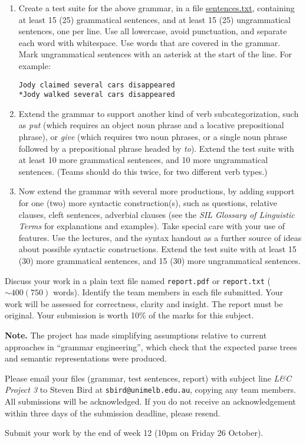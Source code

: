 \documentclass[a4paper,10pt]{article}
\begin{document}
\begin{enumerate}
\item Create a test suite for the above grammar, in a file
\url{sentences.txt}, containing at least 15 (25) grammatical sentences, and at least
15 (25) ungrammatical sentences, one per line.  Use all lowercase, avoid
punctuation, and separate each word with whitespace.   Use words that
are covered in the grammar.
Mark ungrammatical sentences with an asterisk
at the start of the line.  For example:

\begin{verbatim}
Jody claimed several cars disappeared
*Jody walked several cars disappeared
\end{verbatim}

\item Extend the grammar to support another kind of verb subcategorization,
such as \emph{put} (which requires an object noun phrase and a locative
prepositional phrase), or \emph{give} (which requires two noun phrases, or a
single noun phrase followed by a prepositional phrase headed by \emph{to}).
Extend the test suite with at least 10 more grammatical sentences, and 10 more
ungrammatical sentences. (Teams should do this twice, for two different verb types.)

\item Now extend the grammar with several more productions, by adding support
for one (two) more syntactic construction(s), such as
questions, relative clauses, cleft sentences, adverbial clauses
(see the \emph{SIL Glossary of Linguistic Terms} for explanations
and examples).  Take special care with your use of features.
Use the lectures, and the syntax handout
as a further source of ideas about possible syntactic constructions.  Extend the
test suite with at least 15 (30) more grammatical sentences, and 15 (30) more ungrammatical sentences.

\end{enumerate}

Discuss your work in a plain text file named \verb|report.pdf| or \verb|report.txt| ($\sim 400 (750)$ words).
Identify the team members in each file submitted.
Your work will be assessed for correctness, clarity and insight. 
The report must be original.
Your submission is worth 10\% of the marks for this subject.

\textbf{Note.}  The project has made simplifying assumptions
relative to current approaches in ``grammar engineering'',
which check that the expected parse trees and semantic
representations were produced.

Please email your files (grammar, test sentences, report) with subject line
\textit{L\&C Project 3}
to Steven Bird at \texttt{sbird@unimelb.edu.au},
copying any team members.  All submissions will be acknowledged.
If you do not receive an acknowledgement within three days of the submission deadline, please resend.

Submit your work by the end of week 12 (10pm on Friday 26 October).
\end{document}
